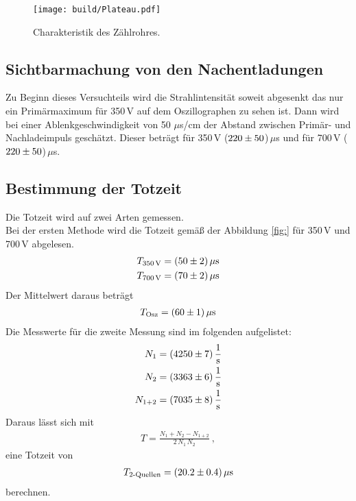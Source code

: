 \begin{figure}[H]
  \centering
  \texttt{[image: build/Plateau.pdf]}
  \caption{Charakteristik des Zählrohres.}
  \label{fig:Char1}
\end{figure}


\subsection{Sichtbarmachung von den Nachentladungen}
Zu Beginn dieses Versuchteils wird die Strahlintensität soweit abgesenkt das nur ein Primärmaximum für 350\,V auf dem Oszillographen zu sehen ist. Dann wird bei einer Ablenkgeschwindigkeit von 50 $\mu$s/cm der Abstand zwischen Primär- und Nachladeimpuls geschätzt. Dieser beträgt für 350\,V ($\num{220 +- 50}$)\,$\mu$s und für 700\,V ($\num{220 +- 50}$)\,$\mu$s.


\subsection{Bestimmung der Totzeit}
Die Totzeit wird auf zwei Arten gemessen. \\
Bei der ersten Methode wird die Totzeit gemäß der Abbildung \eqref{fig:} für 350\,V und 700\,V abgelesen.
\begin{align*}
  T_\text{350\,V} = (\num{50 +- 2})\,\mu\text{s} \\
  T_\text{700\,V} = (\num{70 +- 2})\,\mu\text{s} \\
\end{align*}
Der Mittelwert daraus beträgt
\begin{align*}
  T_\text{Osz} = (\num{60 +- 1})\,\mu\text{s}
\end{align*}
Die Messwerte für die zweite Messung sind im folgenden aufgelistet:
\begin{align*}
  N_1 = (\num{4250 +- 7})\,\frac{1}{\text{s}} \\
  N_2 = (\num{3363 +- 6})\,\frac{1}{\text{s}} \\
  N_{1+2} = (\num{7035 +- 8})\,\frac{1}{\text{s}} \\
\end{align*}
Daraus lässt sich mit
\begin{align*}
  T = \frac{N_1 + N_2 - N_{1+2}}{2\,N_1\,N_2} \ ,
\end{align*}
eine Totzeit von
\begin{align*}
  T_\text{2-Quellen} = (\num{20.2 +- 0.4})\,\mu\text{s}
\end{align*}
berechnen.


